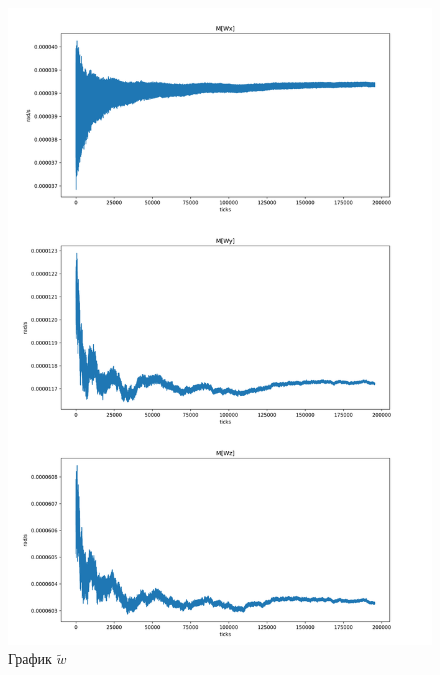 \documentclass[a4paper,14pt]{article}
\theoremstyle{plain} %
\theoremstyle{definition} %
\theoremstyle{remark} %
\begin{document}
{\begin{figure}[h!]
    \centering
    \includegraphics[width=0.99\linewidth]{FullW.png}
    \caption{ График $\widetilde{w}$}
    \label{fig:mw}
\end{figure}

}
\end{document}
